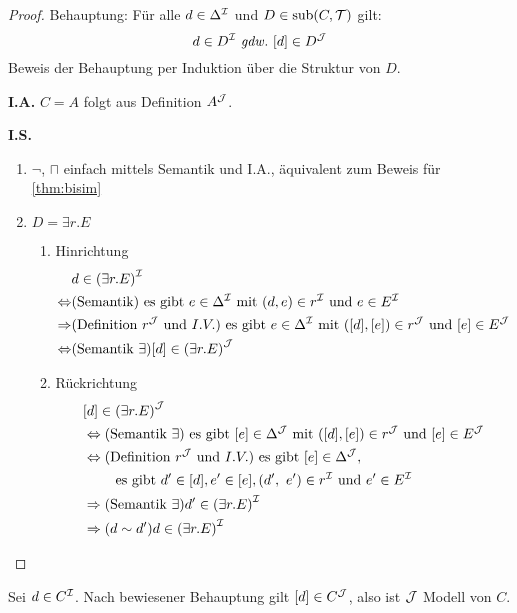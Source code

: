 \begin{tafel}\mbox{}
\begin{proof}
    Behauptung:
Für alle $d \in \Delta^{\mathcal{I}}$ und $D \in \operatorname{sub}(C,\mathcal{T})$ gilt:
\[ d \in D^\MI \gdw \left\lbrack d \right\rbrack \in D^{\MJ} \]
Beweis der Behauptung per Induktion über die Struktur von $D$.

\textbf{I.A.} $C = A$ folgt aus Definition $A^{\mathcal{J}}$.

\textbf{I.S.}

\begin{enumerate}
    \item $\neg$, $\sqcap$ einfach mittels Semantik und I.A., äquivalent zum Beweis für \autoref{thm:bisim}
\item $D = \exists r.E$
  \begin{enumerate}
  \def\labelenumi{\alph{enumi}.}
  \def\labelenumii{\alph{enumii}.}
  \item Hinrichtung
      \begin{align*}
          &d \in \left( \exists r.E \right)^\MI\\
          \Leftrightarrow &(\text{Semantik})\text{ es gibt }e \in \Delta^\MI \text{ mit } \left( d,e \right) \in r^\MI \text{ und } e \in E^\MI \\
          \Rightarrow &(\text{Definition }r^{\MJ} \text{ und } I.V.) \text{ es gibt }e \in \Delta^\MI \text{ mit }\left( \left\lbrack d \right\rbrack,\left\lbrack e \right\rbrack \right) \in r^{\MJ} \text{ und } \left\lbrack e \right\rbrack \in E^{\MJ} \\
          \Leftrightarrow &(\text{Semantik } \exists) \left\lbrack d \right\rbrack \in \left( \exists r.E \right)^{\MJ}
      \end{align*}
    \item Rückrichtung
        \begin{align*}
            &\left\lbrack d \right\rbrack \in \left( \exists r.E \right)^{\MJ} \\
            &\Leftrightarrow (\text{Semantik }\exists) \text{ es gibt }[e] \in \Delta^{\MJ} \text{ mit } \left( \left\lbrack d \right\rbrack,\left\lbrack e \right\rbrack \right) \in r^{\MJ}\text{ und }\left\lbrack e \right\rbrack \in E^{\MJ} \\
            &\Leftrightarrow (\text{Definition }r^{\MJ} \text{ und }I.V.) \text{ es gibt }[e] \in \Delta^{\MJ},\\
            &\quad\quad\text{ es gibt }d' \in \left\lbrack d \right\rbrack, e' \in \left\lbrack e \right\rbrack, \left( d',\ e' \right) \in r^\MI \text{ und }e' \in E^\MI \\
            &\Rightarrow (\text{Semantik }\exists) d' \in \left( \exists r.E \right)^\MI \\
            &\Rightarrow (d \sim d') d \in \left( \exists r.E \right)^\MI
        \end{align*}
\end{enumerate}
\end{enumerate}
\end{proof}
Sei $d \in C^{\mathcal{I}}$. Nach bewiesener Behauptung gilt $[d] \in C^{\mathcal{J}}$, also ist $\mathcal{J}$ Modell von $C$.


\end{tafel}

